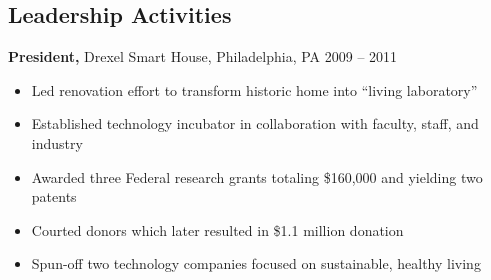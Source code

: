 \documentclass[margin]{res}
\begin{document}
\begin{resume}
\section{Leadership  Activities} 
     {\bf President,} Drexel Smart House, Philadelphia, PA \hfill 2009 -- 2011 %
     \begin{itemize} \itemsep -2pt
     \item Led renovation effort to transform historic home into ``living laboratory''
     \item Established technology incubator in collaboration with faculty, staff, and industry
     \item Awarded three Federal research grants totaling \$160,000 and yielding two patents
     \item Courted donors which later resulted in \$1.1 million donation
     \item Spun-off two technology companies focused on sustainable, healthy living
     \end{itemize}




\end{resume}
\end{document}
